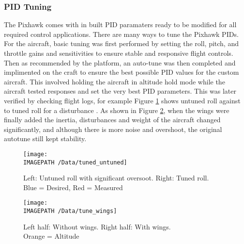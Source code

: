 \subsubsection*{PID Tuning}
The Pixhawk comes with in built PID paramaters ready to be modified for all required control applications.  There are many ways to tune the Pixhawk PIDs. For the aircraft, basic tuning was first performed by setting the roll, pitch, and throttle gains and sensitivities to ensure stable and responsive flight controls. Then as recommended by the platform, an auto-tune was then completed and implimented on the craft to ensure the best possible PID values for the custom aircraft. This involved holding the aircraft in altitude hold mode while the aircraft tested responses and set the very best PID parameters. This was later verified by checking flight logs, for example Figure \ref{fig:tune1} shows untuned roll against to tuned roll for a disturbance . As shown in Figure \ref{fig:tune2}, when the wings were finally added the inertia, disturbances and weight of the aircraft changed significantly, and although there is more noise and overshoot, the original autotune still kept stability. 

\begin{figure}[!h]
	\centering
	\texttt{[image: \\IMAGEPATH /Data/tuned\_untuned]}
	\caption{Left: Untuned roll with significant oversoot. Right: Tuned roll.\\Blue = Desired, Red = Measured}
	\label{fig:tune1}
\end{figure}
\begin{figure}[!h]
	\centering
	\texttt{[image: \\IMAGEPATH /Data/tune\_wings]}
	\caption{Left half: Without wings. Right half: With wings.\\ Orange = Altitude}
	\label{fig:tune2}
\end{figure}


